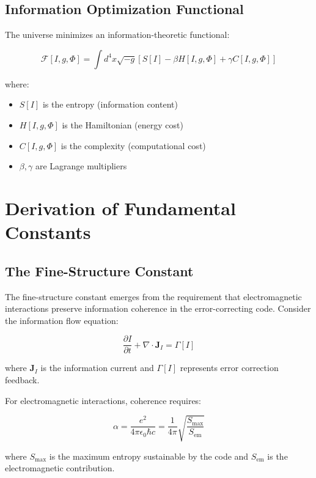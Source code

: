 \documentclass[12pt,a4paper]{article}
\begin{document}
\subsection{Information Optimization Functional}

The universe minimizes an information-theoretic functional:

\begin{equation}
\mathcal{F}[I, g, \Phi] = \int d^4x \sqrt{-g} \left[ S[I] - \beta H[I,g,\Phi] + \gamma C[I,g,\Phi] \right]
\end{equation}

where:
\begin{itemize}
\item $S[I]$ is the entropy (information content)
\item $H[I,g,\Phi]$ is the Hamiltonian (energy cost)
\item $C[I,g,\Phi]$ is the complexity (computational cost)
\item $\beta, \gamma$ are Lagrange multipliers
\end{itemize}

\section{Derivation of Fundamental Constants}

\subsection{The Fine-Structure Constant}

The fine-structure constant emerges from the requirement that electromagnetic interactions preserve information coherence in the error-correcting code. Consider the information flow equation:

\begin{equation}
\frac{\partial I}{\partial t} + \nabla \cdot \mathbf{J}_I = \Gamma[I]
\end{equation}

where $\mathbf{J}_I$ is the information current and $\Gamma[I]$ represents error correction feedback.

For electromagnetic interactions, coherence requires:

\begin{equation}
\alpha = \frac{e^2}{4\pi\epsilon_0\hbar c} = \frac{1}{4\pi} \sqrt{\frac{S_{\text{max}}}{S_{\text{em}}}}
\end{equation}

where $S_{\text{max}}$ is the maximum entropy sustainable by the code and $S_{\text{em}}$ is the electromagnetic contribution.
\end{document}
